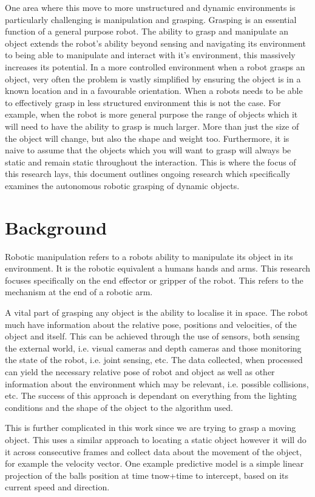 One area where this move to more unstructured and dynamic environments is particularly challenging is manipulation and grasping. Grasping is an essential function of a general purpose robot. The ability to grasp and manipulate an object extends the robot's ability beyond sensing and navigating its environment to being able to manipulate and interact with it's environment, this massively increases its potential. In a more controlled environment when a robot grasps an object, very often the problem is vastly simplified by ensuring the object is in a known location and in a favourable orientation. When a robots needs to be able to effectively grasp in less structured environment this is not the case. For example, when the robot is more general purpose the range of objects which it will need to have the ability to grasp is much larger. More than just the size of the object will change, but also the shape and weight too. Furthermore, it is naive to assume that the objects which you will want to grasp will always be static and remain static throughout the interaction. This is where the focus of this research lays, this document outlines ongoing research which specifically examines the autonomous robotic grasping of dynamic objects.

\section{Background}

Robotic manipulation refers to a robots ability to manipulate its object in its environment. It is the robotic equivalent a humans hands and arms. This research focuses specifically on the end effector or gripper of the robot. This refers to the mechanism at the end of a robotic arm.

A vital part of grasping any object is the ability to localise it in space. The robot much have information about the relative pose, positions and velocities, of the object and itself. This can be achieved through the use of sensors, both sensing the external world, i.e. visual cameras and depth cameras and those monitoring the state of the robot, i.e. joint sensing, etc. The data collected, when processed can yield the necessary relative pose of robot and object as well as other information about the environment which may be relevant, i.e. possible collisions, etc. The success of this approach is dependant on everything from the lighting conditions and the shape of the object to the algorithm used.

This is further complicated in this work since we are trying to grasp a moving object. This uses a similar approach to locating a static object however it will do it across consecutive frames and collect data about the movement of the object, for example the velocity vector. One example predictive model is a simple linear projection of the balls position at time tnow+time to intercept, based on its current speed and direction.

